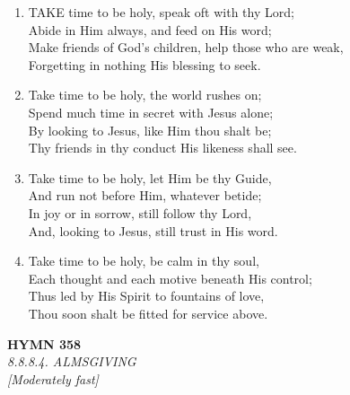 \begin{enumerate}
    \item TAKE time to be holy, speak oft with thy Lord; \\
        Abide in Him always, and feed on His word; \\
        Make friends of God's children, help those who are weak, \\
        Forgetting in nothing His blessing to seek.

    \item Take time to be holy, the world rushes on; \\
        Spend much time in secret with Jesus alone; \\
        By looking to Jesus, like Him thou shalt be; \\
        Thy friends in thy conduct His likeness shall see.

    \item Take time to be holy, let Him be thy Guide, \\
        And run not before Him, whatever betide; \\
        In joy or in sorrow, still follow thy Lord, \\
        And, looking to Jesus, still trust in His word.

    \item Take time to be holy, be calm in thy soul, \\
        Each thought and each motive beneath His control; \\
        Thus led by His Spirit to fountains of love, \\
        Thou soon shalt be fitted for service above.

\end{enumerate}

\newpage
\begin{center}
    {\Large \textbf{HYMN 358}}
    \\
    \textit{8.8.8.4. ALMSGIVING}
    \\
    \textit{\small [Moderately fast]}
\end{center}
\vspace{1em}

